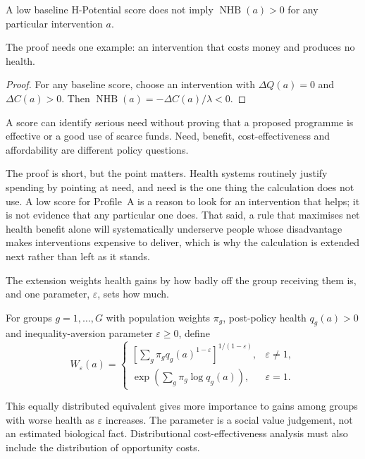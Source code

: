\begin{proposition}
A low baseline H-Potential score does not imply
$\operatorname{NHB}(a)>0$ for any particular intervention $a$.
\end{proposition}
The proof needs one example: an intervention that costs money and produces no
health.
\begin{proof}
For any baseline score, choose an intervention with $\Delta Q(a)=0$ and
$\Delta C(a)>0$. Then
$\operatorname{NHB}(a)=-\Delta C(a)/\lambda<0$.
\end{proof}

\begin{remark}
A score can identify serious need without proving that a proposed programme is
effective or a good use of scarce funds. Need, benefit, cost-effectiveness and
affordability are different policy questions.
\end{remark}

The proof is short, but the point matters. Health systems routinely
justify spending by pointing at need, and need is the one thing the
calculation does not use. A low score for Profile~A is a reason to look for an
intervention that helps; it is not evidence that any particular one does. That said,
a rule that maximises net health benefit alone will systematically underserve
people whose disadvantage makes interventions expensive to deliver, which is
why the calculation is extended next rather than left as it stands.

The extension weights health gains by how badly off the group receiving them
is, and one parameter, $\varepsilon$, sets how much.

\begin{definition}
For groups $g=1,\ldots,G$ with population weights $\pi_g$, post-policy health
$q_g(a)>0$ and inequality-aversion \citep{atkinson_1970} parameter $\varepsilon\ge0$, define
\[
W_\varepsilon(a)=
\begin{cases}
\left[\sum_g\pi_gq_g(a)^{1-\varepsilon}\right]^{1/(1-\varepsilon)},
&\varepsilon\ne1,\\
\exp\left(\sum_g\pi_g\log q_g(a)\right),&\varepsilon=1.
\end{cases}
\]
\end{definition}

\begin{remark}
This equally distributed equivalent gives more importance to gains among groups
with worse health as $\varepsilon$ increases. The parameter is a social value
judgement, not an estimated biological fact. Distributional cost-effectiveness
analysis must also include the distribution of opportunity costs.
\citep{asaria_2016_dcea}
\end{remark}

